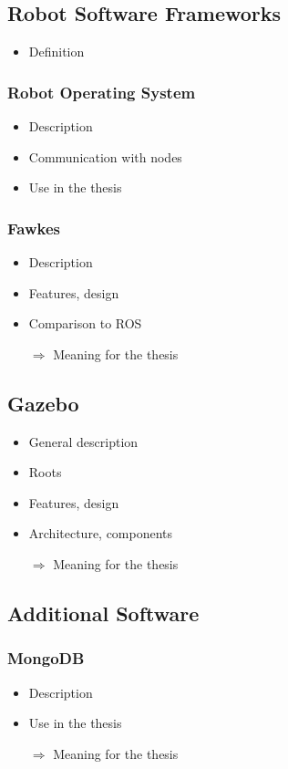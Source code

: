 \documentclass[a4paper,11pt]{article}
\begin{document}
\subsection{Robot Software Frameworks}
\begin{itemize}
\item Definition
\end{itemize}
\subsubsection{Robot Operating System}
\begin{itemize}
\item Description
\item Communication with nodes
\item Use in the thesis
\end{itemize}
\subsubsection{Fawkes}
\begin{itemize}
\item Description
\item Features, design
\item Comparison to ROS
\item[$\Rightarrow$] Meaning for the thesis
\end{itemize}
\subsection{Gazebo}
\begin{itemize}
\item General description
\item Roots
\item Features, design
\item Architecture, components
\item[$\Rightarrow$] Meaning for the thesis
\end{itemize}
\subsection{Additional Software}
\subsubsection{MongoDB}
\begin{itemize}
\item Description
\item Use in the thesis
\item[$\Rightarrow$] Meaning for the thesis
\end{itemize}
\end{document}
